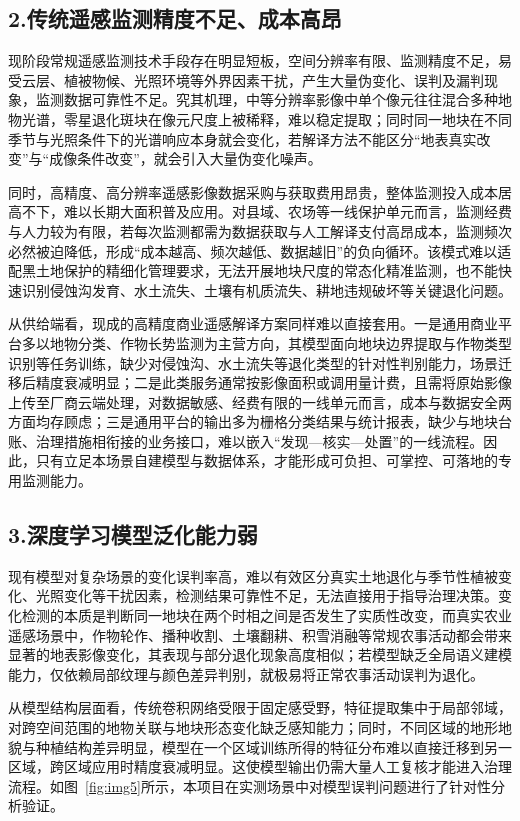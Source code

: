 \documentclass[12pt, a4paper]{ctexart}
\begin{document}
\subsection{2.传统遥感监测精度不足、成本高昂}

现阶段常规遥感监测技术手段存在明显短板，空间分辨率有限、监测精度不足，易受云层、植被物候、光照环境等外界因素干扰，产生大量伪变化、误判及漏判现象，监测数据可靠性不足。究其机理，中等分辨率影像中单个像元往往混合多种地物光谱，零星退化斑块在像元尺度上被稀释，难以稳定提取；同时同一地块在不同季节与光照条件下的光谱响应本身就会变化，若解译方法不能区分“地表真实改变”与“成像条件改变”，就会引入大量伪变化噪声。

同时，高精度、高分辨率遥感影像数据采购与获取费用昂贵，整体监测投入成本居高不下，难以长期大面积普及应用。对县域、农场等一线保护单元而言，监测经费与人力较为有限，若每次监测都需为数据获取与人工解译支付高昂成本，监测频次必然被迫降低，形成“成本越高、频次越低、数据越旧”的负向循环。该模式难以适配黑土地保护的精细化管理要求，无法开展地块尺度的常态化精准监测，也不能快速识别侵蚀沟发育、水土流失、土壤有机质流失、耕地违规破坏等关键退化问题。

从供给端看，现成的高精度商业遥感解译方案同样难以直接套用。一是通用商业平台多以地物分类、作物长势监测为主营方向，其模型面向地块边界提取与作物类型识别等任务训练，缺少对侵蚀沟、水土流失等退化类型的针对性判别能力，场景迁移后精度衰减明显；二是此类服务通常按影像面积或调用量计费，且需将原始影像上传至厂商云端处理，对数据敏感、经费有限的一线单元而言，成本与数据安全两方面均存顾虑；三是通用平台的输出多为栅格分类结果与统计报表，缺少与地块台账、治理措施相衔接的业务接口，难以嵌入“发现—核实—处置”的一线流程。因此，只有立足本场景自建模型与数据体系，才能形成可负担、可掌控、可落地的专用监测能力。

\subsection{3.深度学习模型泛化能力弱}

现有模型对复杂场景的变化误判率高，难以有效区分真实土地退化与季节性植被变化、光照变化等干扰因素，检测结果可靠性不足，无法直接用于指导治理决策。变化检测的本质是判断同一地块在两个时相之间是否发生了实质性改变，而真实农业遥感场景中，作物轮作、播种收割、土壤翻耕、积雪消融等常规农事活动都会带来显著的地表影像变化，其表现与部分退化现象高度相似；若模型缺乏全局语义建模能力，仅依赖局部纹理与颜色差异判别，就极易将正常农事活动误判为退化。

从模型结构层面看，传统卷积网络\cite{ref5,ref7}受限于固定感受野，特征提取集中于局部邻域，对跨空间范围的地物关联与地块形态变化缺乏感知能力；同时，不同区域的地形地貌与种植结构差异明显，模型在一个区域训练所得的特征分布难以直接迁移到另一区域，跨区域应用时精度衰减明显。这使模型输出仍需大量人工复核才能进入治理流程。如图~\ref{fig:img5}所示，本项目在实测场景中对模型误判问题进行了针对性分析验证。
\end{document}
